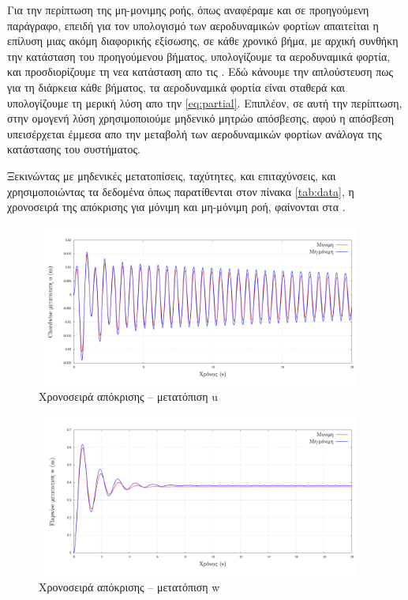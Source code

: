 Για την περίπτωση της μη-μονιμης ροής, όπως αναφέραμε και σε προηγούμενη παράγραφο, επειδή για τον υπολογισμό των αεροδυναμικών φορτίων απαιτείται η επίλυση μιας ακόμη διαφορικής εξίσωσης, σε κάθε χρονικό βήμα, με αρχική συνθήκη την κατάσταση του προηγούμενου βήματος, υπολογίζουμε τα αεροδυναμικά φορτία, και προσδιορίζουμε τη νεα κατάσταση απο τις . Εδώ κάνουμε την απλούστευση πως για τη διάρκεια κάθε βήματος, τα αεροδυναμικά φορτία είναι σταθερά και υπολογίζουμε τη μερική λύση απο την \cref{eq:partial}. Επιπλέον, σε αυτή την περίπτωση, στην ομογενή λύση χρησιμοποιούμε μηδενικό μητρώο απόσβεσης, αφού η απόσβεση υπεισέρχεται έμμεσα απο την μεταβολή των αεροδυναμικών φορτίων ανάλογα της κατάστασης του συστήματος. 

Ξεκινώντας με μηδενικές μετατοπίσεις, ταχύτητες, και επιταχύνσεις, και χρησιμοποιώντας τα δεδομένα όπως παρατίθενται στον πίνακα \ref{tab:data}, η χρονοσειρά της απόκρισης για μόνιμη και μη-μόνιμη ροή, φαίνονται στα .

\begin{figure}[ht!]
    \begin{center}
        \includegraphics[width=0.95\textwidth]{./figures/time_u.pdf}
    \end{center}
    \caption{Χρονοσειρά απόκρισης -- μετατόπιση u}
    \label{fig:responseu}
\end{figure}

\begin{figure}[ht!]
    \begin{center}
        \includegraphics[width=0.95\textwidth]{./figures/time_w.pdf}
    \end{center}
    \caption{Χρονοσειρά απόκρισης -- μετατόπιση w}
    \label{fig:responsew}
\end{figure}

